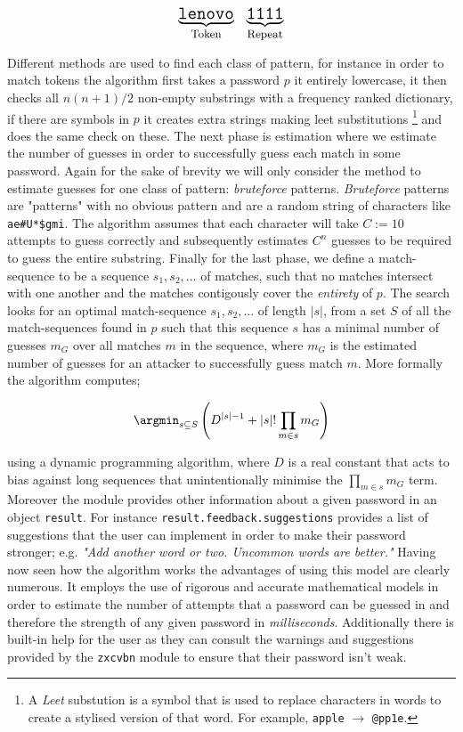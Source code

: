 \[
  \Large
  \underbrace{ \mathtt{lenovo} }_\text{\small Token} 
  \; \; \;
  \underbrace{ \mathtt{1111} }_\text{\small Repeat}
\]

Different methods are used to find each class of pattern, for 
instance in order to match tokens the algorithm first takes
a password $p$ it entirely lowercase, it then checks all 
$n(n+1)/2$ non-empty substrings with a frequency ranked
dictionary, if there are symbols in $p$ it creates extra 
strings making leet substitutions \footnote{A \textit{Leet}
substution is a symbol that is used to replace characters in words
to create a stylised version of that word. For example,
\texttt{apple} $\rightarrow$ \texttt{@pp1e}.}
and does the same check on these. The next phase is
estimation where we estimate the number of guesses in order
to successfully guess each match in some password. Again
for the sake of brevity we will only consider the method to 
estimate guesses for one class of pattern: \textit{bruteforce}
patterns. \textit{Bruteforce} patterns are "patterns" with no
obvious pattern and are a random string of characters like
\texttt{ae\#U*\$gmi}. The algorithm assumes that each
character will take $C := 10$ attempts to guess correctly and 
subsequently estimates $C^n$ guesses to be required to guess
the entire substring. Finally for the last phase, we define a
match-sequence to be a sequence $s_1, s_2, ...$ of matches, 
such that no matches intersect with one another and the
matches contigously cover the \textit{entirety} of $p$. 
The search looks
for an optimal match-sequence $s_1, s_2, ...$ of length
$\left|s\right|$, from a set $S$ of all the match-sequences
found in $p$ such that this sequence $s$ has a minimal number
of guesses $m_G$ over all matches $m$ in the sequence, where 
$m_G$ is the estimated number of guesses for an attacker to 
successfully guess match $m$. More formally the algorithm 
computes;

\[
  \argmin_{s \subseteq S} \left( D^{\left|s\right| -1} + 
  \left|s\right|! \prod_{m \in s} m_G \right)
\]

using a dynamic programming algorithm,
where $D$ is a real constant that acts to bias against long
sequences that unintentionally minimise the 
$\prod_{m \in s} m_G$ term. Moreover the module provides other
information about a given password in an object 
\texttt{result}. For instance 
\texttt{result.feedback.suggestions} provides a list of 
suggestions that the user can implement in order to make their
password stronger; e.g. \textit{"Add another word or two.
Uncommon words are better."} Having now seen how the 
algorithm works the advantages of using this model are clearly
numerous. It employs the use of
rigorous and accurate mathematical models in order to estimate
the number of attempts that a password can be guessed in and 
therefore the strength of any given password in 
\emph{milliseconds}. Additionally there is built-in help for 
the user as they can consult the warnings and suggestions 
provided by the \texttt{zxcvbn} module to ensure that their
password isn't weak. \\ \vspace{0.2cm}

